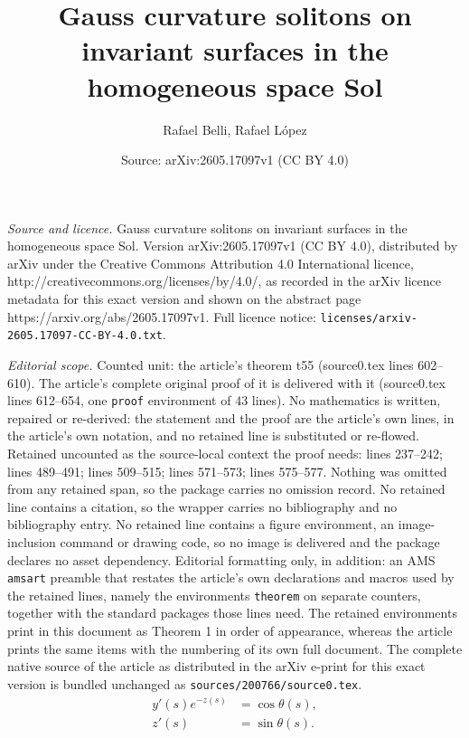\documentclass[10pt,a4paper]{amsart}
\title{Gauss curvature solitons on invariant surfaces in the homogeneous space Sol}
\author{Rafael Belli, Rafael L\'opez}
\date{Source: arXiv:2605.17097v1 (CC BY 4.0)}
\begin{document}
\maketitle

\noindent\emph{Source and licence.} Gauss curvature solitons on invariant surfaces in the homogeneous space Sol. Version arXiv:2605.17097v1 (CC BY 4.0), distributed by arXiv under the Creative Commons Attribution 4.0 International licence, http://creativecommons.org/licenses/by/4.0/, as recorded in the arXiv licence metadata for this exact version and shown on the abstract page https://arxiv.org/abs/2605.17097v1. Full licence notice: \texttt{licenses/arxiv-2605.17097-CC-BY-4.0.txt}.\par\smallskip

\noindent\textit{Editorial scope.} Counted unit: the article's theorem t55 (source0.tex lines 602--610). The article's complete original proof of it is delivered with it (source0.tex lines 612--654, one \texttt{proof} environment of 43 lines). No mathematics is written, repaired or re-derived: the statement and the proof are the article's own lines, in the article's own notation, and no retained line is substituted or re-flowed.  Retained uncounted as the source-local context the proof needs: lines 237--242; lines 489--491; lines 509--515; lines 571--573; lines 575--577.  Nothing was omitted from any retained span, so the package carries no omission record.  No retained line contains a citation, so the wrapper carries no bibliography and no bibliography entry.  No retained line contains a figure environment, an image-inclusion command or drawing code, so no image is delivered and the package declares no asset dependency.  Editorial formatting only, in addition: an AMS \texttt{amsart} preamble that restates the article's own declarations and macros used by the retained lines, namely the environments \texttt{theorem} on separate counters, together with the standard packages those lines need.  The retained environments print in this document as Theorem 1 in order of appearance, whereas the article prints the same items with the numbering of its own full document.  The complete native source of the article as distributed in the arXiv e-print for this exact version is bundled unchanged as \texttt{sources/200766/source0.tex}.
\begin{equation}\label{1pp}
\begin{split}
y'(s) e^{-z(s)} &= \cos\theta(s), \\
z'(s) &= \sin\theta(s). 
\end{split}
\end{equation}
\end{document}
